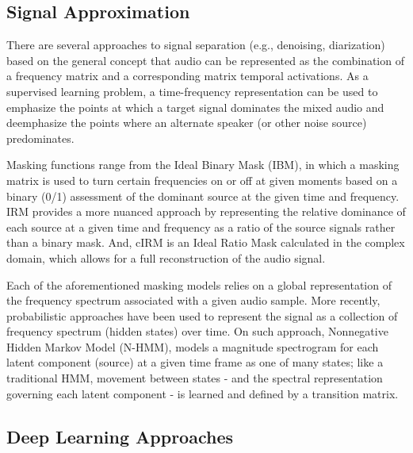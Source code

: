 \documentclass[journal, a4paper]{IEEEtran}
\begin{document}
\subsection{Signal Approximation}

There are several approaches to signal separation (e.g., denoising, diarization) based on the general concept that audio can be represented as the combination of a frequency matrix and a corresponding matrix temporal activations. As a supervised learning problem, a time-frequency  representation can be used to emphasize the points at which a target signal dominates the mixed audio and deemphasize the points where an alternate speaker (or other noise source) predominates.\cite{DBLP:journals/corr/abs-1708-07524}

Masking functions range from the Ideal Binary Mask (IBM), in which a masking matrix is used to turn certain frequencies on or off at given moments based on a binary (0/1) assessment of the dominant source at the given time and frequency.\cite{DBLP:journals/corr/abs-1708-07524} IRM provides a more nuanced approach by representing the relative dominance of each source at a given time and frequency as a ratio of the source signals rather than a binary mask. And, cIRM is an Ideal Ratio Mask calculated in the complex domain, which allows for a full reconstruction of the audio signal. \cite{DBLP:journals/corr/abs-1708-07524} 

Each of the aforementioned masking models relies on a global representation of the frequency spectrum associated with a given audio sample.  More recently, probabilistic approaches have been used to represent the signal as a collection of frequency spectrum (hidden states) over time. On such approach, Nonnegative Hidden Markov Model (N-HMM), models a magnitude spectrogram for each latent component (source) at a given time frame as one of many states; like a traditional HMM, movement between states - and the spectral representation governing each latent component - is learned and defined by a transition matrix. 
\cite{10.1007/978-3-642-15995-4_18}

\subsection{Deep Learning Approaches}
\end{document}
